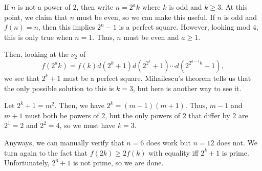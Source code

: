 \documentclass{scrartcl}
\begin{document}
If $n$ is not a power of $2$, then write $n = 2^ak$ where $k$ is odd and $k \geq 3$.
At this point, we claim that $n$ must be even, so we can make this useful.
If $n$ is odd and $f(n) = n$, then this implies $2^n - 1$ is a perfect square.
However, looking mod $4$, this is only true when $n = 1$.
Thus, $n$ must be even and $a \geq 1$.

Then, looking at the $\nu_2$ of
\[ f(2^ak) = f(k)d(2^k + 1)d(2^{2^k} + 1)\cdots d(2^{2^{a-1}k} + 1), \]
we see that $2^k + 1$ must be a perfect square.
Mihailescu's theorem tells us that the only possible solution to this is $k=3$, but here is another way to see it.

Let $2^k + 1 = m^2$.
Then, we have $2^k = (m-1)(m+1)$.
Thus, $m-1$ and $m+1$ must both be powers of $2$, but the only powers of $2$ that differ by $2$ are $2^1 = 2$ and $2^2 = 4$, so we must have $k = 3$.

Anyways, we can manually verify that $n=6$ does work but $n=12$ does not.
We turn again to the fact that $f(2k) \geq 2f(k)$ with equality iff $2^k + 1$ is prime.
Unfortunately, $2^6 + 1$ is not prime, so we are done.
\end{document}
